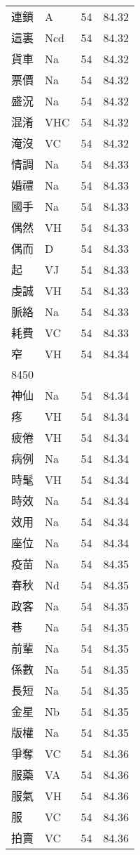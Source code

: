 \documentclass[twocolumn]{book}
\begin{document}
\begin{supertabular}{llrr}
連鎖 & A & 54 &  84.32\\
這裏 & Ncd & 54 &  84.32\\
貨車 & Na & 54 &  84.32\\
票價 & Na & 54 &  84.32\\
盛況 & Na & 54 &  84.32\\
混淆 & VHC & 54 &  84.32\\
淹沒 & VC & 54 &  84.32\\
情調 & Na & 54 &  84.33\\
婚禮 & Na & 54 &  84.33\\
國手 & Na & 54 &  84.33\\
偶然 & VH & 54 &  84.33\\
偶而 & D & 54 &  84.33\\
起 & VJ & 54 &  84.33\\
虔誠 & VH & 54 &  84.33\\
脈絡 & Na & 54 &  84.33\\
耗費 & VC & 54 &  84.33\\
窄 & VH & 54 &  84.34\\
8450\\
神仙 & Na & 54 &  84.34\\
疼 & VH & 54 &  84.34\\
疲倦 & VH & 54 &  84.34\\
病例 & Na & 54 &  84.34\\
時髦 & VH & 54 &  84.34\\
時效 & Na & 54 &  84.34\\
效用 & Na & 54 &  84.34\\
座位 & Na & 54 &  84.34\\
疫苗 & Na & 54 &  84.35\\
春秋 & Nd & 54 &  84.35\\
政客 & Na & 54 &  84.35\\
巷 & Na & 54 &  84.35\\
前輩 & Na & 54 &  84.35\\
係數 & Na & 54 &  84.35\\
長短 & Na & 54 &  84.35\\
金星 & Nb & 54 &  84.35\\
版權 & Na & 54 &  84.35\\
爭奪 & VC & 54 &  84.36\\
服藥 & VA & 54 &  84.36\\
服氣 & VH & 54 &  84.36\\
服 & VC & 54 &  84.36\\
拍賣 & VC & 54 &  84.36\\

\end{supertabular}
\end{document}
